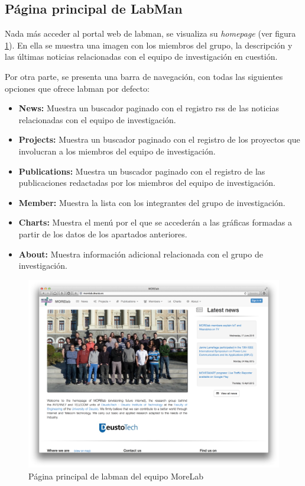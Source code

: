 \subsection{Página principal de LabMan}

Nada más acceder al portal web de \acrshort{labman}, se visualiza su \textit{homepage} (ver figura \ref{fig:morelab_homepage}). En ella se muestra una imagen con los miembros del grupo, la descripción y las últimas noticias relacionadas con el equipo de investigación en cuestión.

Por otra parte, se presenta una barra de navegación, con todas las siguientes opciones que ofrece \acrshort{labman} por defecto:

\begin{itemize}
	\item \textbf{News:} Muestra un buscador paginado con el registro \acrfull{rss} de las noticias relacionadas con el equipo de investigación.
	\item \textbf{Projects:} Muestra un buscador paginado con el registro de los proyectos que involucran a los miembros del equipo de investigación.
	\item \textbf{Publications:} Muestra un buscador paginado con el registro de las publicaciones redactadas por los miembros del equipo de investigación.
	\item \textbf{Member:} Muestra la lista con los integrantes del grupo de investigación.
	\item \textbf{Charts:} Muestra el menú por el que se accederán a las gráficas formadas a partir de los datos de los apartados anteriores.
	\item \textbf{About:} Muestra información adicional relacionada con el grupo de investigación.
\end{itemize}

\begin{figure}[!htbp]
	\centering
	\includegraphics[scale=0.31]{fig/morelab_homepage}
	\caption{Página principal de \acrshort{labman} del equipo MoreLab}
	\label{fig:morelab_homepage}
\end{figure}

